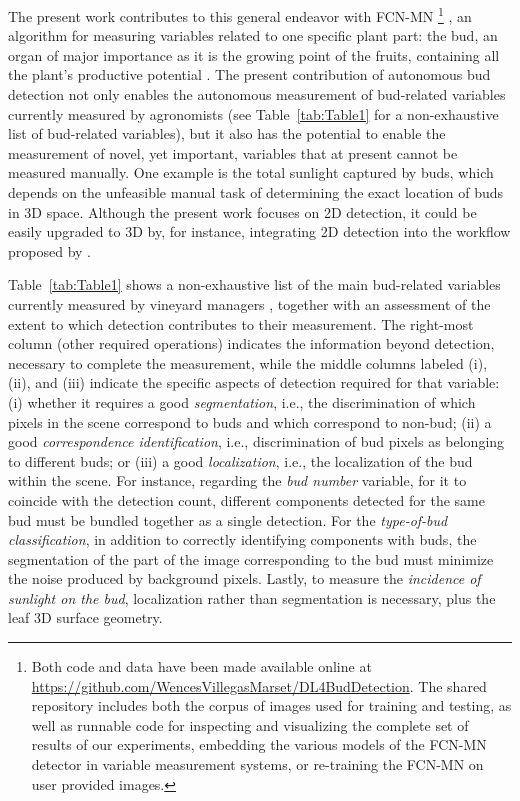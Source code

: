 \documentclass[a4paper,authoryear,review]{elsarticle}
\begin{document}
The present work contributes to this general endeavor with FCN-MN \footnote{Both code and data have been made available online at \url{https://github.com/WencesVillegasMarset/DL4BudDetection}. The shared repository includes both the corpus of images used for training and testing, as well as runnable code for inspecting and visualizing the complete set of results of our experiments, embedding the various models of the FCN-MN detector in variable measurement systems, or re-training the FCN-MN on user provided images.} \citep{long2015fully, shelhamer2017fully}, an algorithm for measuring variables related to one specific plant part: the bud, an organ of major importance as it is the growing point of the fruits, containing all the plant’s productive potential \citep{may2000bud}. 
The present contribution of autonomous bud detection not only enables the autonomous measurement of bud-related variables currently measured by agronomists (see Table~\ref{tab:Table1} for a non-exhaustive list of bud-related variables), but it also has the potential to enable the measurement of novel, yet important, variables that at present cannot be measured manually. One example is the total sunlight captured by buds, which depends on the unfeasible manual task of determining the exact location of buds in 3D space. Although the present work focuses on 2D detection, it could be easily upgraded to 3D by, for instance, integrating 2D detection into the workflow proposed by \citet{diaz2018grapevine}.


Table~\ref{tab:Table1} shows a non-exhaustive list of the main bud-related variables currently measured by vineyard managers \citep{sanchez2005bud, noyce2016basis, collins2020effects}, together with an assessment of the extent to which detection contributes to their measurement. The right-most column (other required operations) indicates the information beyond detection, necessary to complete the measurement, while the middle columns labeled (i), (ii), and (iii) indicate the specific aspects of detection required for that variable: (i) whether it requires a good \emph{segmentation}, i.e., the discrimination of which pixels in the scene correspond to buds and which correspond to non-bud; (ii) a good \emph{correspondence identification}, i.e., discrimination of bud pixels as belonging to different buds; or (iii) a good \emph{localization}, i.e., the localization of the bud within the scene.
For instance, regarding the \emph{bud number} variable, for it to coincide with the detection count, different components detected for the same bud must be bundled together as a single detection. For the \emph{type-of-bud classification}, in addition to correctly identifying components with buds, the segmentation of the part of the image corresponding to the bud must minimize the noise produced by background pixels. Lastly, to measure the \emph{incidence of sunlight on the bud}, localization rather than segmentation is necessary, plus the leaf 3D surface geometry.
\end{document}
